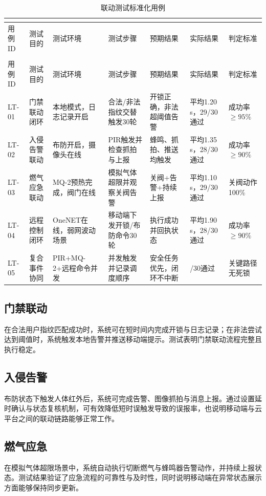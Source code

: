 \documentclass[UTF8,12pt,a4paper,oneside]{ctexbook}
\renewcommand{\arraystretch}{1.15}
\numberwithin{equation}{chapter}
\renewcommand{\thetable}{\thechapter.\arabic{table}}
\begin{document}
{\renewcommand{\arraystretch}{1.2}
\begin{longtable}{>{\raggedright\arraybackslash}p{1.2cm} >{\raggedright\arraybackslash}p{1.8cm} >{\raggedright\arraybackslash}p{2.2cm} >{\raggedright\arraybackslash}p{2.3cm} >{\raggedright\arraybackslash}p{2.1cm} >{\raggedright\arraybackslash}p{2.1cm} >{\raggedright\arraybackslash}p{1.8cm}}
\caption{联动测试标准化用例}\\
\label{tab:linkage_cases}\\
\toprule
用例ID & 测试目的 & 测试环境 & 测试步骤 & 预期结果 & 实际结果 & 判定标准 \\
\midrule
\endfirsthead
\multicolumn{7}{c}{\tablename\ \thetable\ （续）}\\
\toprule
用例ID & 测试目的 & 测试环境 & 测试步骤 & 预期结果 & 实际结果 & 判定标准 \\
\midrule
\endhead
\bottomrule
\endfoot
LT-01 & 门禁联动闭环 & 本地模式，日志记录开启 & 合法/非法指纹交替触发30轮 & 开锁正确，非法超阈值告警 & 平均1.20\,s，29/30通过 & 成功率$\geq95\%$ \\
LT-02 & 入侵告警联动 & 布防开启，摄像头在线 & PIR触发并检查抓拍与上报 & 蜂鸣、抓拍、推送均触发 & 平均1.35\,s，28/30通过 & 成功率$\geq90\%$ \\
LT-03 & 燃气应急联动 & MQ-2预热完成，阀门在线 & 模拟气体超限并观察关阀告警 & 关阀+告警+持续上报 & 平均1.10\,s，29/30通过 & 关阀动作100\% \\
LT-04 & 远程控制闭环 & OneNET在线，弱网波动场景 & 移动端下发开锁/布防命令30轮 & 执行成功并回执状态 & 平均1.90\,s，28/30通过 & 成功率$\geq90\%$ \\
LT-05 & 复合事件协同 & PIR+MQ-2+远程命令并发 & 并发触发并记录调度顺序 & 安全任务优先，闭环不中断 & 30/30通过 & 关键路径无死锁 \\
\end{longtable}
}
\subsection{门禁联动}
在合法用户指纹匹配成功时，系统可在短时间内完成开锁与日志记录；在非法尝试达到阈值时，系统触发本地告警并推送移动端提示。测试表明门禁联动流程完整且执行稳定。
\subsection{入侵告警}
布防状态下触发人体红外后，系统可完成告警、图像抓拍与消息上报。通过设置延时确认与状态复核机制，可有效降低短时误触发导致的误报率，也说明移动端与云平台之间的联动链路能够正常工作。
\subsection{燃气应急}
在模拟气体超限场景中，系统自动执行切断燃气与蜂鸣器告警动作，并持续上报状态。测试结果验证了应急流程的可靠性与及时性，同时说明移动端在异常状态展示方面能够保持同步更新。
\end{document}
